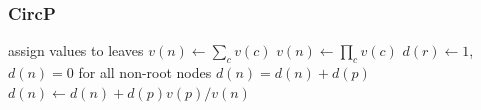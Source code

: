 \documentclass[trans,aspectratio=1610]{beamer}
\newcommand\cI{{\cal I}}
\begin{document}
\begin{frame}
 \frametitle{CircP}
  \begin{scriptsize}
\begin{algorithmic}[1]
\State assign values to leaves
    \State $v(n)\gets \sum_{c}v(c)$
  \Else
    \State $v(n)\gets \prod_{c}v(c)$
  \EndIf
\EndFor
\State $d(r)\gets 1$, $d(n)=0$ for all non-root nodes
      \State $d(n)=d(n)+d(p)$
    \Else
      \State $d(n)\gets d(n)+d(p)v(p)/v(n)$
    \EndIf
  \EndFor
\EndFor
\EndProcedure
\end{algorithmic}
  \end{scriptsize}
\end{frame}
%
%
%
%
%
%
%
\end{document}
